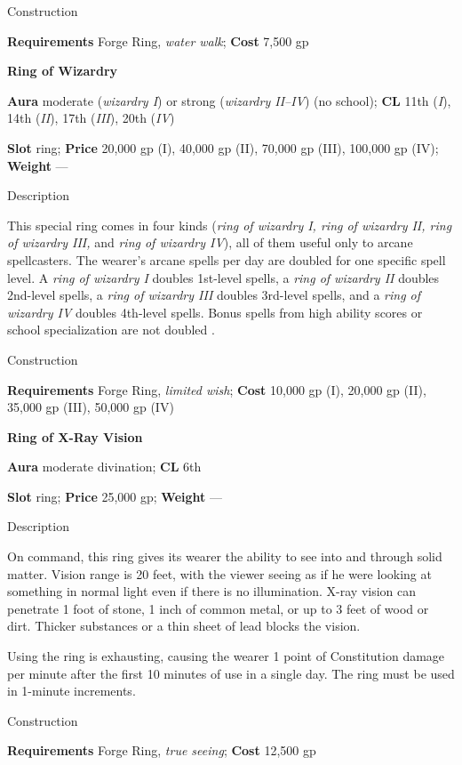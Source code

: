Construction
				
\textbf{Requirements} Forge Ring, \textit{water walk}; \textbf{Cost }7,500 gp
				
\textbf{Ring of Wizardry}
				
\textbf{Aura} moderate (\textit{wizardry I}) or strong (\textit{wizardry II--IV}) (no school);\textbf{ CL }11th (\textit{I}), 14th (\textit{II}), 17th (\textit{III}), 20th (\textit{IV})
				
\textbf{Slot} ring; \textbf{Price} 20,000 gp (I), 40,000 gp (II), 70,000 gp (III), 100,000 gp (IV); \textbf{Weight} ---
				
Description
				
This special ring comes in four kinds (\textit{ring of wizardry I, ring of wizardry II, ring of wizardry III, }and \textit{ring of wizardry IV}), all of them useful only to arcane spellcasters. The wearer's arcane spells per day 
are doubled
 for one specific spell level. A \textit{ring of wizardry I }doubles 1st-level spells, a \textit{ring of wizardry II }doubles 2nd-level spells, a \textit{ring of wizardry III }doubles 3rd-level spells, and a \textit{ring of wizardry IV }doubles 4th-level spells. Bonus spells from high ability scores or school specialization 
are not doubled
. 
				
Construction
				
\textbf{Requirements} Forge Ring, \textit{limited wish}; \textbf{Cost }10,000 gp (I), 20,000 gp (II), 35,000 gp (III), 50,000 gp (IV)
				
\textbf{Ring of X-Ray Vision}
				
\textbf{Aura} moderate divination;\textbf{ CL }6th
				
\textbf{Slot} ring; \textbf{Price} 25,000 gp; \textbf{Weight} ---
				
Description
				
On command, this ring gives its wearer the ability to see into and through solid matter. Vision range is 20 feet, with the viewer seeing as if he were looking at something in normal light even if there is no illumination. X-ray vision can penetrate 1 foot of stone, 1 inch of common metal, or up to 3 feet of wood or dirt. Thicker substances or a thin sheet of lead blocks the vision.
				
Using the ring is exhausting, causing the wearer 1 point of Constitution damage per minute after the first 10 minutes of use in a single day. The ring must be used in 1-minute increments.
				
Construction
				
\textbf{Requirements} Forge Ring, \textit{true seeing}; \textbf{Cost }12,500 gp
        	
